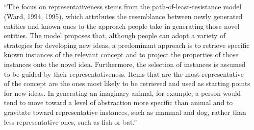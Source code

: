 \documentclass[12pt]{article}
\begin{document}
\subsection{\cite{ward2002role}}
\begin{displayquote}
``The focus on representativeness stems from the path-of-least-resistance model (Ward, 1994, 1995), which attributes the resemblance between newly generated entities and known ones to the approach people take in generating those novel entities. The model proposes that, although people can adopt a variety of strategies for developing new ideas, a predominant approach is to retrieve specific known instances of the relevant concept and to project the properties of those instances onto the novel idea. Furthermore, the selection of instances is assumed to be guided by their representativeness. Items that are the most representative of the concept are the ones most likely to be retrieved and used as starting points for new ideas. In generating an imaginary animal, for example, a person would tend to move toward a level of abstraction more specific than animal and to gravitate toward representative instances, such as mammal and dog, rather than less representative ones, such as fish or bat.''
\end{displayquote}
\end{document}
